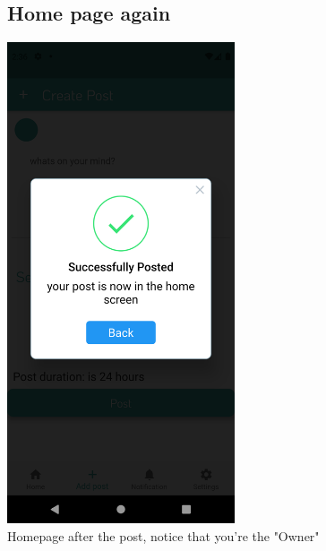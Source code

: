 \documentclass[12pt]{article}
\begin{document}
  
\begin{figure}[h!]
\vspace{-2cm}
  \subsection*{Home page again}
\centerline{\includegraphics[width=0.6\textwidth]{./Screenshots/12.PNG}}
  \caption{Homepage after the post, notice that you're the "Owner"}
  \end{figure}
\end{document}
